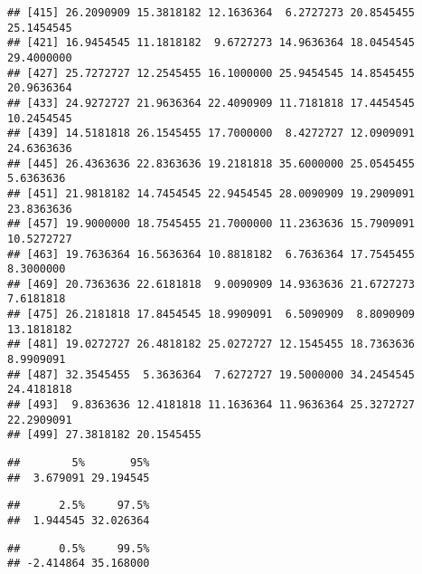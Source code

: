 \documentclass[]{book}
\newenvironment{Shaded}{\begin{snugshade}}{\end{snugshade}}
\newcommand{\CommentTok}[1]{\textcolor[rgb]{0.56,0.35,0.01}{\textit{#1}}}
\newcommand{\FloatTok}[1]{\textcolor[rgb]{0.00,0.00,0.81}{#1}}
\newcommand{\KeywordTok}[1]{\textcolor[rgb]{0.13,0.29,0.53}{\textbf{#1}}}
\newcommand{\NormalTok}[1]{#1}
\begin{document}
\begin{verbatim}
## [415] 26.2090909 15.3818182 12.1636364  6.2727273 20.8545455 25.1454545
## [421] 16.9454545 11.1818182  9.6727273 14.9636364 18.0454545 29.4000000
## [427] 25.7272727 12.2545455 16.1000000 25.9454545 14.8545455 20.9636364
## [433] 24.9272727 21.9636364 22.4090909 11.7181818 17.4454545 10.2454545
## [439] 14.5181818 26.1545455 17.7000000  8.4272727 12.0909091 24.6363636
## [445] 26.4363636 22.8363636 19.2181818 35.6000000 25.0545455  5.6363636
## [451] 21.9818182 14.7454545 22.9454545 28.0090909 19.2909091 23.8363636
## [457] 19.9000000 18.7545455 21.7000000 11.2363636 15.7909091 10.5272727
## [463] 19.7636364 16.5636364 10.8818182  6.7636364 17.7545455  8.3000000
## [469] 20.7363636 22.6181818  9.0090909 14.9363636 21.6727273  7.6181818
## [475] 26.2181818 17.8454545 18.9909091  6.5090909  8.8090909 13.1818182
## [481] 19.0272727 26.4818182 25.0272727 12.1545455 18.7363636  8.9909091
## [487] 32.3545455  5.3636364  7.6272727 19.5000000 34.2454545 24.4181818
## [493]  9.8363636 12.4181818 11.1636364 11.9636364 25.3272727 22.2909091
## [499] 27.3818182 20.1545455
\end{verbatim}

\begin{Shaded}
\end{Shaded}

\begin{verbatim}
##        5%       95% 
##  3.679091 29.194545
\end{verbatim}

\begin{Shaded}
\end{Shaded}

\begin{verbatim}
##      2.5%     97.5% 
##  1.944545 32.026364
\end{verbatim}

\begin{Shaded}
\end{Shaded}

\begin{verbatim}
##      0.5%     99.5% 
## -2.414864 35.168000
\end{verbatim}


\end{document}
